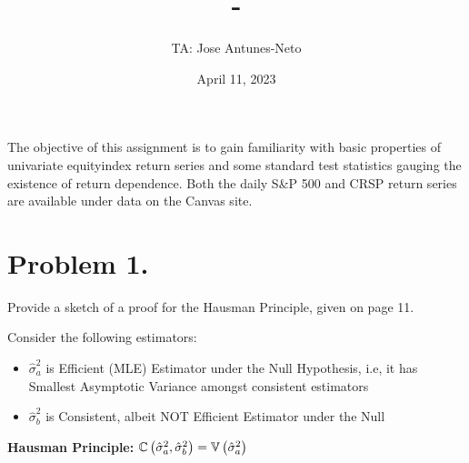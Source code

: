 \documentclass[12pt,twoside]{article}
\title{\course-\assignment}
\author{TA: Jose Antunes-Neto}
\date{April 11, 2023}
\begin{document}
\maketitle

The objective of this assignment is to gain familiarity with basic properties of univariate equityindex return series and some standard test statistics gauging the existence of return dependence. Both the daily S\&P 500 and CRSP return series are available under data on the Canvas site.

\section{Problem 1.}
Provide a sketch of a proof for the Hausman Principle, given on page 11.
\begin{prop*} Consider the following estimators:
    \begin{itemize}
        \item $\hat\sigma_a^2$ is Efficient (MLE) Estimator under the Null Hypothesis, i.e, it has Smallest Asymptotic Variance amongst consistent estimators
        \item $\hat\sigma_b^2$ is Consistent, albeit NOT Efficient Estimator under the Null
    \end{itemize}
    \begin{center}
        \textbf{Hausman Principle:} $\mathbb{C}\left( \hat\sigma_a^2, \hat\sigma_b^2 \right) = \mathbb{V}\left(\hat\sigma_a^2\right)$
    \end{center}
\end{prop*}
\end{document}
